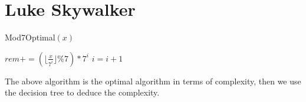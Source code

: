 \documentclass[a4paper]{article}
\begin{document}
  \section{Luke Skywalker}
  \begin{algorithm}
    \caption{Mod7Optimal$(x)$}\label{alg:cap1}
    \begin{algorithmic}[1]
      \State $rem += (\lfloor \frac x {7^i}\rfloor \% 7)*7^i$
      \State $i=i+1$
      \EndWhile
    \end{algorithmic}
  \end{algorithm}
  The above algorithm is the optimal algorithm in terms of complexity, then we use the decision tree to deduce the complexity.
  \begin{center}
    \label{alg:cap}
    \begin{tikzpicture}[x=0.75pt,y=0.75pt,yscale=-1,xscale=1]


\end{tikzpicture}
\end{center}
\end{document}
